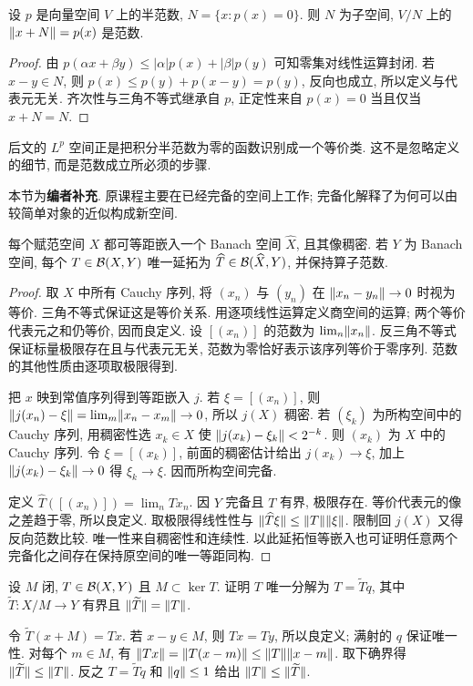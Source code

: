 \begin{proposition}
设 $p$ 是向量空间 $V$ 上的半范数, $N=\{x:p(x)=0\}$. 则 $N$ 为子空间, $V/N$ 上的 $\lVert x+N\rVert=p(x)$ 是范数.
\end{proposition}
\begin{proof}
由 $p(\alpha x+\beta y)\le|\alpha|p(x)+|\beta|p(y)$ 可知零集对线性运算封闭. 若 $x-y\in N$, 则 $p(x)\le p(y)+p(x-y)=p(y)$, 反向也成立, 所以定义与代表元无关. 齐次性与三角不等式继承自 $p$, 正定性来自 $p(x)=0$ 当且仅当 $x+N=N$.
\end{proof}
后文的 $L^p$ 空间正是把积分半范数为零的函数识别成一个等价类. 这不是忽略定义的细节, 而是范数成立所必须的步骤.

本节为\textbf{编者补充}. 原课程主要在已经完备的空间上工作; 完备化解释了为何可以由较简单对象的近似构成新空间.

\begin{theorem}\label{thm:completion}
每个赋范空间 $X$ 都可等距嵌入一个 Banach 空间 $\widehat X$, 且其像稠密. 若 $Y$ 为 Banach 空间, 每个 $T\in\mathcal B(X,Y)$ 唯一延拓为 $\widehat T\in\mathcal B(\widehat X,Y)$, 并保持算子范数.
\end{theorem}
\begin{proof}
取 $X$ 中所有 Cauchy 序列, 将 $(x_n)$ 与 $(y_n)$ 在 $\lVert x_n-y_n\rVert\to0$ 时视为等价. 三角不等式保证这是等价关系. 用逐项线性运算定义商空间的运算; 两个等价代表元之和仍等价, 因而良定义. 设 $[(x_n)]$ 的范数为 $\lim_n\lVert x_n\rVert$. 反三角不等式保证标量极限存在且与代表元无关, 范数为零恰好表示该序列等价于零序列. 范数的其他性质由逐项取极限得到.

把 $x$ 映到常值序列得到等距嵌入 $j$. 若 $\xi=[(x_n)]$, 则 $\lVert j(x_n)-\xi\rVert=\lim_m\lVert x_n-x_m\rVert\to0$, 所以 $j(X)$ 稠密. 若 $(\xi_k)$ 为所构空间中的 Cauchy 序列, 用稠密性选 $x_k\in X$ 使 $\lVert j(x_k)-\xi_k\rVert<2^{-k}$. 则 $(x_k)$ 为 $X$ 中的 Cauchy 序列. 令 $\xi=[(x_k)]$, 前面的稠密估计给出 $j(x_k)\to\xi$, 加上 $\lVert j(x_k)-\xi_k\rVert\to0$ 得 $\xi_k\to\xi$. 因而所构空间完备.

定义 $\widehat T([(x_n)])=\lim_nTx_n$. 因 $Y$ 完备且 $T$ 有界, 极限存在. 等价代表元的像之差趋于零, 所以良定义. 取极限得线性性与 $\lVert \widehat T\xi\rVert\le\lVert T\rVert\lVert \xi\rVert$. 限制回 $j(X)$ 又得反向范数比较. 唯一性来自稠密性和连续性. 以此延拓恒等嵌入也可证明任意两个完备化之间存在保持原空间的唯一等距同构.
\end{proof}

\begin{exercise}\label{legacy:ch02:exercise1}
设 $M$ 闭, $T\in\mathcal B(X,Y)$ 且 $M\subset\ker T$. 证明 $T$ 唯一分解为 $T=\widetilde Tq$, 其中 $\widetilde T:X/M\to Y$ 有界且 $\lVert \widetilde T\rVert=\lVert T\rVert$.
\end{exercise}
\begin{solution}
令 $\widetilde T(x+M)=Tx$. 若 $x-y\in M$, 则 $Tx=Ty$, 所以良定义; 满射的 $q$ 保证唯一性. 对每个 $m\in M$, 有 $\lVert Tx\rVert=\lVert T(x-m)\rVert\le\lVert T\rVert\lVert x-m\rVert$. 取下确界得 $\lVert \widetilde T\rVert\le\lVert T\rVert$. 反之 $T=\widetilde Tq$ 和 $\lVert q\rVert\le1$ 给出 $\lVert T\rVert\le\lVert \widetilde T\rVert$.
\end{solution}

